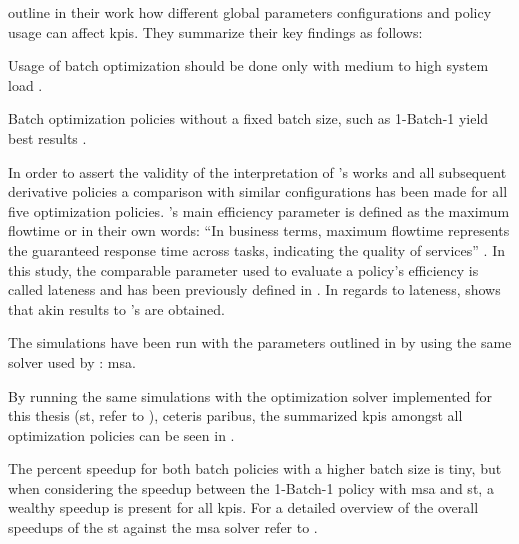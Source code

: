 \documentclass[draft=false]{seal_thesis}
\begin{document}
\citet[pp. 18-22]{Zeng2005} outline in their work how different global parameters configurations and policy usage can affect \glspl{kpi}. They summarize their key findings as follows:
\begin{enumerate*}
	\item Usage of batch optimization should be done only with medium to high system load \citep[p. 24]{Zeng2005}.
	\item Batch optimization policies without a fixed batch size, such as 1-Batch-1 yield best results \citep[p. 24]{Zeng2005}.
\end{enumerate*}

In order to assert the validity of the interpretation of \citet{Zeng2005}'s works and all subsequent derivative policies a comparison with similar configurations has been made for all five optimization policies. \citet{Zeng2005}'s main efficiency parameter is defined as the maximum flowtime or in their own words: ``In business terms, maximum flowtime represents the guaranteed response time across tasks, indicating the quality of services'' \citep[p. 17]{Zeng2005}. In this study, the comparable parameter used to evaluate a policy's efficiency is called lateness and has been previously defined in . In regards to lateness,  shows that akin results to \citet{Zeng2005}'s are obtained.


The simulations have been run with the parameters outlined in  by using the same solver used by \citet{Zeng2005}: \gls{msa}.

By running the same simulations with the optimization solver implemented for this thesis (\ie \gls{st}, refer to ), ceteris paribus, the summarized \glspl{kpi} amongst all optimization policies can be seen in .


The percent speedup for both batch policies with a higher batch size is tiny, but when considering the speedup between the 1-Batch-1 policy with \gls{msa} and \gls{st}, a wealthy speedup is present for all \glspl{kpi}. For a detailed overview of the overall speedups of the \gls{st} against the \gls{msa} solver refer to .
\end{document}
